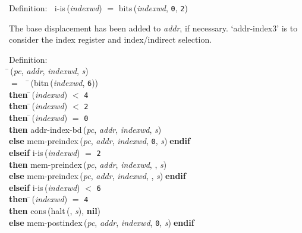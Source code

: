 \begin{tabbing}{\sc Definition}:$\;\;$
{\rm{i-is}}\,({\it{indexwd\/}}) $=$ {\rm{bits}}\,({\it{indexwd\/}}, {\tt{0}}, {\tt{2}})
\end{tabbing}

 The base displacement has been added to {\it{addr\/}}, if necessary.  `addr-index3'
 is to consider the index register and index/indirect selection.
\begin{tabbing}{\sc Definition}: \\  
\=\,({\it{pc\/}}, {\it{addr\/}}, {\it{indexwd\/}}, {\it{s\/}}) \\ 
$=$$\;\;\;\;$\=\,({\rm{bitn}}\,({\it{indexwd\/}}, {\tt{6}})) \\ 
{\bf then }\=\,({\it{indexwd\/}}) $<$ {\tt{4}} \\ 
{\bf then }\=\,({\it{indexwd\/}}) $<$ {\tt{2}} \\ 
{\bf then }\=\,({\it{indexwd\/}}) $=$ {\tt{0}} \\ 
{\bf then }{\rm{addr-index-bd}}\,({\it{pc\/}}, {\it{addr\/}}, {\it{indexwd\/}}, {\it{s\/}}) \\ 
{\bf else }{\rm{mem-preindex}}\,({\it{pc\/}}, {\it{addr\/}}, {\it{indexwd\/}}, {\tt{0}}, {\it{s\/}})$\;${\bf  endif}\- \\ 
{\bf elseif }{\rm{i-is}}\,({\it{indexwd\/}}) $=$ {\tt{2}} \\ 
{\bf then }{\rm{mem-preindex}}\,({\it{pc\/}}, {\it{addr\/}}, {\it{indexwd\/}}, {}, {\it{s\/}}) \\ 
{\bf else }{\rm{mem-preindex}}\,({\it{pc\/}}, {\it{addr\/}}, {\it{indexwd\/}}, {}, {\it{s\/}})$\;${\bf  endif}\- \\ 
{\bf elseif }{\rm{i-is}}\,({\it{indexwd\/}}) $<$ {\tt{6}} \\ 
{\bf then }\=\,({\it{indexwd\/}}) $=$ {\tt{4}} \\ 
{\bf then }{\rm{cons}}\,({\rm{halt}}\,({}, {\it{s\/}}), {\bf{nil}}) \\ 
{\bf else }{\rm{mem-postindex}}\,({\it{pc\/}}, {\it{addr\/}}, {\it{indexwd\/}}, {\tt{0}}, {\it{s\/}})$\;${\bf  endif}\- \\ 
$$
\end{tabbing}
